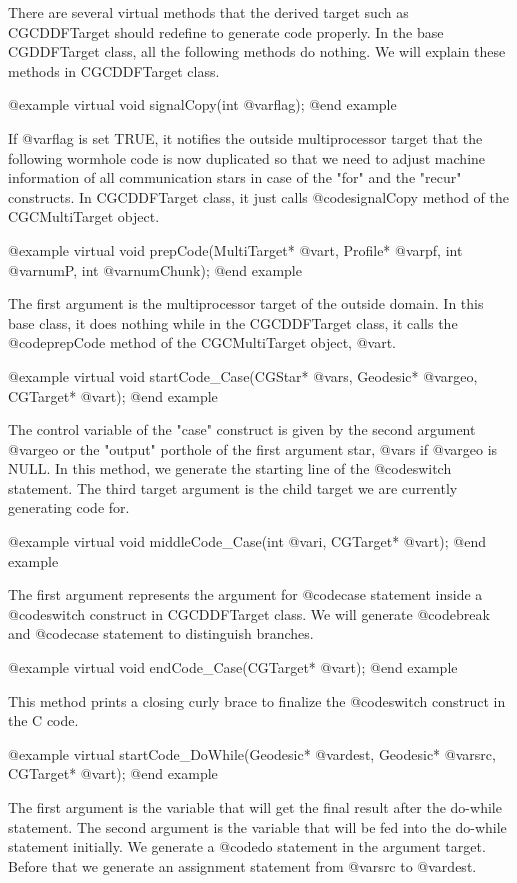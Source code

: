 {There are several virtual methods that the derived target such as CGCDDFTarget
should redefine to generate code properly. In the base CGDDFTarget class,
all the following methods do nothing. We will explain these methods in
CGCDDFTarget class.

@example
virtual void signalCopy(int @var{flag});
@end example

If @var{flag} is set TRUE, it notifies the outside multiprocessor target
that the following wormhole code is now duplicated so that we need to adjust
machine information of all communication stars in case of the "for" and
the "recur" constructs. In CGCDDFTarget class, it just calls
@code{signalCopy} method of the CGCMultiTarget object. 

@example
virtual void prepCode(MultiTarget* @var{t}, Profile* @var{pf}, int @var{numP}, int @var{numChunk});
@end example

The first argument is the multiprocessor target of the outside domain.
In this base class, it does nothing while in the CGCDDFTarget class, it
calls the @code{prepCode} method of the CGCMultiTarget object, @var{t}.

@example
virtual void startCode_Case(CGStar* @var{s}, Geodesic* @var{geo}, CGTarget* @var{t});
@end example

The control variable of the "case" construct is given by the second
argument @var{geo} or the "output" porthole of the first argument
star, @var{s} if @var{geo} is NULL. In this method, we generate
the starting line of the @code{switch} statement. The third target argument
is the child target we are currently generating code for.

@example
virtual void middleCode_Case(int @var{i}, CGTarget* @var{t});
@end example

The first argument represents the argument for @code{case} statement
inside a @code{switch} construct in CGCDDFTarget class. We will generate
@code{break} and @code{case} statement to distinguish branches.

@example
virtual void endCode_Case(CGTarget* @var{t});
@end example

This method prints a closing curly brace to finalize the @code{switch}
construct in the C code.

@example
virtual startCode_DoWhile(Geodesic* @var{dest}, Geodesic* @var{src}, CGTarget* @var{t});
@end example

The first argument is the variable that will get the final result after the
do-while statement. The second argument is the variable that will be fed into
the do-while statement initially. We generate a @code{do} statement in
the argument target. Before that we generate an assignment statement from
@var{src} to @var{dest}.

}
